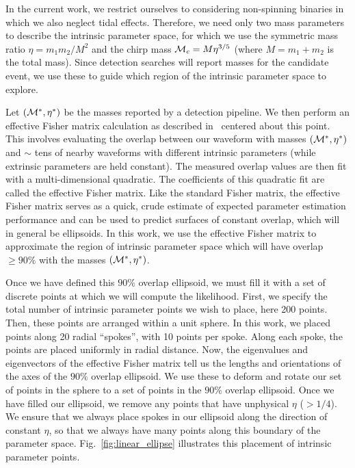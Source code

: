 In the current work, we restrict ourselves to considering non-spinning binaries in which we also neglect tidal
effects. Therefore, we need only two mass parameters to describe the intrinsic parameter space, for which we use
the symmetric mass ratio $\eta = m_1 m_2 / M^2$ 
and the chirp mass ${\cal M}_c = M \eta^{3/5}$ (where $M = m_1+m_2$ is the total mass).
Since detection searches will report masses for the candidate event, we use these
to guide which region of the intrinsic parameter space to explore.

Let $\left( {\cal M}^*,\eta^* \right)$ be the masses reported by a detection pipeline. We then perform an effective 
Fisher matrix calculation as described in~\cite{gwastro-mergers-HeeSuk-FisherMatrixWithAmplitudeCorrections,
gwastro-mergers-HeeSuk-CompareToPE-Aligned}
centered about this point.
This involves evaluating the overlap between our waveform with masses $\left( {\cal M}^*,\eta^* \right)$
and $\sim$ tens of nearby waveforms with different intrinsic parameters (while extrinsic parameters are held constant).
The measured overlap values are then fit with a multi-dimensional quadratic. 
The coefficients of this quadratic fit are called the effective Fisher matrix.
Like the standard Fisher matrix, the effective Fisher matrix serves as a quick, crude estimate of expected parameter
estimation performance and can be used to predict surfaces of constant overlap, which will in general be ellipsoids.
In this work, we use the effective Fisher matrix to approximate the region of intrinsic parameter space
which will have overlap $\geq 90\%$ with the masses $\left( {\cal M}^*,\eta^* \right)$.

Once we have defined this $90\%$ overlap ellipsoid, we must fill it with a set of discrete points 
at which we will compute the likelihood. First, we specify the total number of intrinsic parameter points we wish to
place, here  200 points. Then, these points are arranged within a unit sphere. In this work, we placed
points along 20 radial ``spokes'', with 10 points per spoke. Along each spoke, the points are placed 
uniformly in radial distance. Now, the eigenvalues and eigenvectors of the effective Fisher matrix tell us the lengths
and orientations of the axes of the $90\%$ overlap ellipsoid. We use these to deform and rotate our set
of points in the sphere to a set of points in the $90\%$ overlap ellipsoid.
Once we have filled our ellipsoid, we remove
any points that have unphysical $\eta$ ($>1/4$).   %
We ensure that we always place spokes in our ellipsoid along the direction of constant $\eta$,
so that we always have many points along this boundary of the parameter space.
Fig.~\ref{fig:linear_ellipse} illustrates this placement of intrinsic parameter points.

